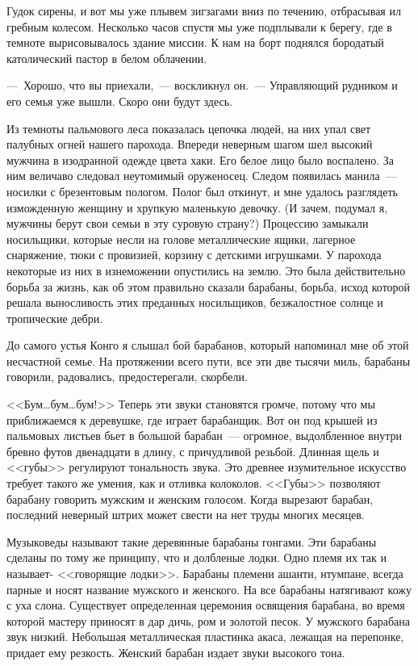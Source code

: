 \documentclass[12pt,a4paper,twoside,openany,svgnames]{memoir}
\begin{document}
Гудок сирены, и вот мы уже плывем зигзагами вниз по течению, отбрасывая ил гребным колесом. Несколько часов спустя мы уже подплывали к берегу, где в темноте вырисовывалось здание миссии. К нам на борт поднялся бородатый католический пастор в белом облачении.

---~Хорошо, что вы приехали,~--- воскликнул он.~--- Управляющий рудником и его семья уже вышли. Скоро они будут здесь.

Из темноты пальмового леса показалась цепочка людей, на них упал свет палубных огней нашего парохода. Впереди неверным шагом шел высокий мужчина в изодранной одежде цвета хаки. Его белое лицо было воспалено. За ним величаво следовал неутомимый оруженосец. Следом появилась манила~--- носилки с брезентовым пологом. Полог был откинут, и мне удалось разглядеть изможденную женщину и хрупкую маленькую девочку. (И зачем, подумал я, мужчины берут свои семьи в эту суровую страну?) Процессию замыкали носильщики, которые несли на голове металлические ящики, лагерное снаряжение, тюки с провизией, корзину с детскими игрушками. У парохода некоторые из них в изнеможении опустились на землю. Это была действительно борьба за жизнь, как об этом правильно сказали барабаны, борьба, исход которой решала выносливость этих преданных носильщиков, безжалостное солнце и тропические дебри.

До самого устья Конго я слышал бой барабанов, который напоминал мне об этой несчастной семье. На протяжении всего пути, все эти две тысячи миль, барабаны говорили, радовались, предостерегали, скорбели.

<<Бум\ldots бум\ldots бум!>> Теперь эти звуки становятся громче, потому что мы приближаемся к деревушке, где играет барабанщик. Вот он под крышей из пальмовых листьев бьет в большой барабан~--- огромное, выдолбленное внутри бревно футов двенадцати в длину, с причудливой резьбой. Длинная щель и <<губы>> регулируют тональность звука. Это древнее изумительное искусство требует такого же умения, как и отливка колоколов. <<Губы>> позволяют барабану говорить мужским и женским голосом. Когда вырезают барабан, последний неверный штрих может свести на нет труды многих месяцев.

Музыковеды называют такие деревянные барабаны гонгами. Эти барабаны сделаны по тому же принципу, что и долбленые лодки. Одно племя их так и называет- <<говорящие лодки>>. Барабаны племени ашанти, нтумпане, всегда парные и носят название мужского и женского. На все барабаны натягивают кожу с уха слона. Существует определенная церемония освящения барабана, во время которой мастеру приносят в дар дичь, ром и золотой песок. У мужского барабана звук низкий. Небольшая металлическая пластинка акаса, лежащая на перепонке, придает ему резкость. Женский барабан издает звуки высокого тона.
\end{document}
